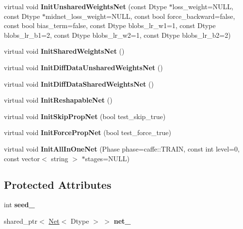 \begin{DoxyCompactItemize}
\mbox{\label{classcaffe_1_1_net_test_a5e6af59162dda1d59814d0f80d99179d}} 
virtual void {\bfseries Init\+Unshared\+Weights\+Net} (const Dtype $\ast$loss\+\_\+weight=N\+U\+LL, const Dtype $\ast$midnet\+\_\+loss\+\_\+weight=N\+U\+LL, const bool force\+\_\+backward=false, const bool bias\+\_\+term=false, const Dtype blobs\+\_\+lr\+\_\+w1=1, const Dtype blobs\+\_\+lr\+\_\+b1=2, const Dtype blobs\+\_\+lr\+\_\+w2=1, const Dtype blobs\+\_\+lr\+\_\+b2=2)
\item 
\mbox{\label{classcaffe_1_1_net_test_a14c3354c87bb018f7a97aae77c897bda}} 
virtual void {\bfseries Init\+Shared\+Weights\+Net} ()
\item 
\mbox{\label{classcaffe_1_1_net_test_a2146df0bbac525db9c786ae499fa413d}} 
virtual void {\bfseries Init\+Diff\+Data\+Unshared\+Weights\+Net} ()
\item 
\mbox{\label{classcaffe_1_1_net_test_a4c5af2e3284dd7649fb22510b2300dbf}} 
virtual void {\bfseries Init\+Diff\+Data\+Shared\+Weights\+Net} ()
\item 
\mbox{\label{classcaffe_1_1_net_test_acb60954c3aafc1b360f55eb4e02b109c}} 
virtual void {\bfseries Init\+Reshapable\+Net} ()
\item 
\mbox{\label{classcaffe_1_1_net_test_a0e535c55673656e0702809b3a753913a}} 
virtual void {\bfseries Init\+Skip\+Prop\+Net} (bool test\+\_\+skip\+\_\+true)
\item 
\mbox{\label{classcaffe_1_1_net_test_a8bc850a5f4fad600667eea2c5cbaae21}} 
virtual void {\bfseries Init\+Force\+Prop\+Net} (bool test\+\_\+force\+\_\+true)
\item 
\mbox{\label{classcaffe_1_1_net_test_afea0798571c656bc349a5248e7d4e6ef}} 
virtual void {\bfseries Init\+All\+In\+One\+Net} (Phase phase=caffe\+::\+T\+R\+A\+IN, const int level=0, const vector$<$ string $>$ $\ast$stages=N\+U\+LL)
\end{DoxyCompactItemize}
\subsection*{Protected Attributes}
\begin{DoxyCompactItemize}
\item 
\mbox{\label{classcaffe_1_1_net_test_aecbf750bb8772da0e10b50df01866132}} 
int {\bfseries seed\+\_\+}
\item 
\mbox{\label{classcaffe_1_1_net_test_a817fffa6ceeef1beed3e07b75f57fa9c}} 
shared\+\_\+ptr$<$ \mbox{\hyperlink{classcaffe_1_1_net}{Net}}$<$ Dtype $>$ $>$ {\bfseries net\+\_\+}
\end{DoxyCompactItemize}
